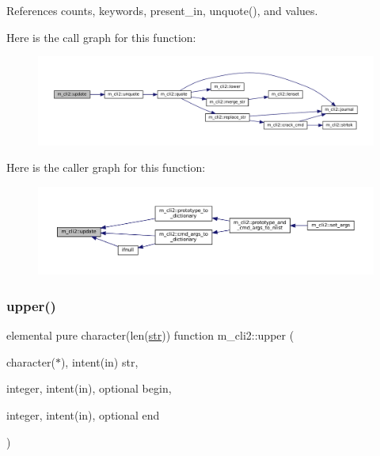 References counts, keywords, present\+\_\+in, unquote(), and values.

Here is the call graph for this function\+:\nopagebreak
\begin{figure}[H]
\begin{center}
\leavevmode
\includegraphics[width=350pt]{namespacem__cli2_a160d56bc4a10faef7e8a8a4f04f4dadb_cgraph}
\end{center}
\end{figure}
Here is the caller graph for this function\+:\nopagebreak
\begin{figure}[H]
\begin{center}
\leavevmode
\includegraphics[width=350pt]{namespacem__cli2_a160d56bc4a10faef7e8a8a4f04f4dadb_icgraph}
\end{center}
\end{figure}
\mbox{\label{namespacem__cli2_afa7a2419002024ff6d950c5d905ddd7a}} 
\subsubsection{\texorpdfstring{upper()}{upper()}}
{\footnotesize\ttfamily elemental pure character(len(\mbox{\hyperlink{interfacem__cli2_1_1str}{str}})) function m\+\_\+cli2\+::upper (\begin{DoxyParamCaption}\item[{character($\ast$), intent(in)}]{str,  }\item[{integer, intent(in), optional}]{begin,  }\item[{integer, intent(in), optional}]{end }\end{DoxyParamCaption})\hspace{0.3cm}{\ttfamily [private]}}



